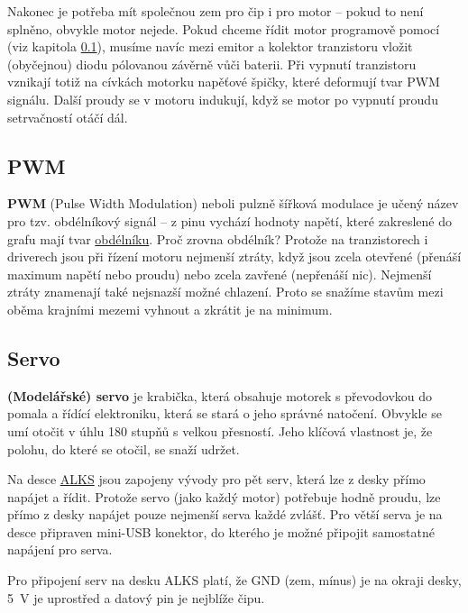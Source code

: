 Nakonec je potřeba mít společnou zem pro čip i pro motor -- pokud to není splněno, obvykle motor nejede. 
Pokud chceme řídit motor programově pomocí (viz kapitola \ref{PWM}), 
musíme navíc mezi emitor a kolektor tranzistoru vložit (obyčejnou) diodu pólovanou závěrně vůči baterii. 
Při vypnutí tranzistoru vznikají totiž na cívkách motorku napěťové špičky, které deformují tvar PWM signálu.  
Další proudy se v motoru indukují, když se motor po vypnutí proudu setrvačností otáčí dál. 





\subsection{PWM} \label{PWM}   

{\bf PWM}  (Pulse Width Modulation) neboli pulzně šířková modulace je učený název pro tzv. obdélníkový signál -- z pinu vychází hodnoty napětí, které zakreslené do grafu mají tvar 
\href{https://www.arduino.cc/en/Tutorial/PWM}{obdélníku}.
 Proč zrovna obdélník? Protože na tranzistorech i driverech jsou při řízení motoru nejmenší ztráty, když jsou zcela otevřené (přenáší maximum napětí nebo proudu) nebo zcela zavřené (nepřenáší nic). Nejmenší ztráty znamenají také nejsnazší možné chlazení. Proto se snažíme stavům mezi oběma krajními mezemi vyhnout a zkrátit je na minimum. 


 \subsection{Servo} \label{servo}  

{\bf (Modelářské) servo} je krabička, která obsahuje motorek s převodovkou do pomala a řídící elektroniku, která se stará o jeho správné natočení. Obvykle se umí otočit v úhlu 180 stupňů s velkou přesností. Jeho klíčová vlastnost je, že polohu, do které se otočil, se snaží udržet. 

Na desce \hyperref[alks]{ALKS} jsou zapojeny vývody pro pět serv, která lze z desky přímo napájet a řídit. 
Protože servo (jako každý motor) potřebuje hodně proudu, lze přímo z desky napájet pouze nejmenší serva každé zvlášť. Pro větší serva je na desce připraven mini-USB konektor, do kterého je možné připojit samostatné napájení pro serva. 

Pro připojení serv na desku ALKS platí, že GND (zem, mínus) je na okraji desky, 5~V je uprostřed a datový pin je nejblíže čipu. 

